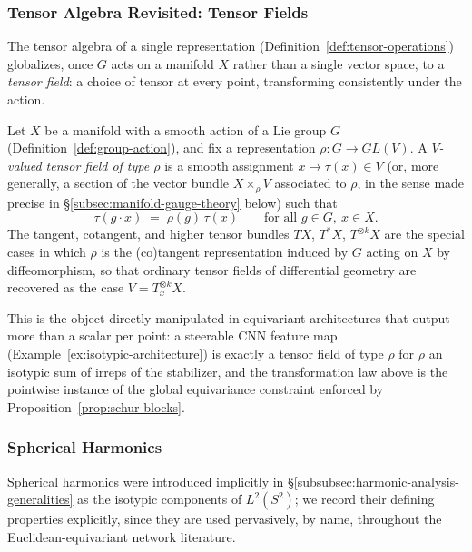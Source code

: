\documentclass[mathematics,review,submit,moreauthors]{Definitions/mdpi}
\begin{document}
\subsubsection{Tensor Algebra Revisited: Tensor Fields}
\label{subsec:tensor-fields}

The tensor algebra of a single representation
(Definition~\ref{def:tensor-operations}) globalizes, once $G$ acts on a
manifold $X$ rather than a single vector space, to a \emph{tensor field}: a
choice of tensor at every point, transforming consistently under the action.

\begin{Definition}
\label{def:tensor-field}
Let $X$ be a manifold with a smooth action of a Lie group $G$
(Definition~\ref{def:group-action}), and fix a representation
$\rho : G \to GL(V)$. A \emph{$V$-valued tensor field of type $\rho$} is a
smooth assignment $x \mapsto \tau(x) \in V$ (or, more generally, a section of
the vector bundle $X \times_\rho V$ associated to $\rho$, in the sense made
precise in \S\ref{subsec:manifold-gauge-theory} below) such that
\[
    \tau(g \cdot x) \;=\; \rho(g)\, \tau(x) \qquad \text{for all } g \in G,\ x \in X.
\]
The tangent, cotangent, and higher tensor bundles $TX$, $T^*X$,
$T^{\otimes k}X$ are the special cases in which $\rho$ is the (co)tangent
representation induced by $G$ acting on $X$ by diffeomorphism, so that
ordinary tensor fields of differential geometry are recovered as the case
$V = T_x^{\otimes k}X$.
\end{Definition}

This is the object directly manipulated in equivariant architectures that
output more than a scalar per point: a steerable CNN feature map
(Example~\ref{ex:isotypic-architecture}) is exactly a tensor field of type
$\rho$ for $\rho$ an isotypic sum of irreps of the stabilizer, and the
transformation law above is the pointwise instance of the global
equivariance constraint enforced by Proposition~\ref{prop:schur-blocks}.

\subsubsection{Spherical Harmonics}
\label{subsec:spherical-harmonics}

Spherical harmonics were introduced implicitly in
\S\ref{subsubsec:harmonic-analysis-generalities} as the isotypic components
of $L^2(S^2)$; we record their defining properties explicitly, since they
are used pervasively, by name, throughout the Euclidean-equivariant network
literature.
\end{document}
